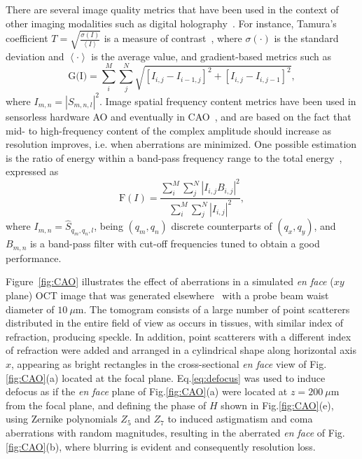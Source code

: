 There are several image quality metrics that have been used in the context of other imaging modalities such as digital holography~\cite{Trujillo2015_Comparative}. For instance, Tamura's coefficient $T = \sqrt{\frac{\sigma(I)}{\left<I\right>}}$ is a measure of contrast~\cite{Memmolo2011_Automatic}, where $\sigma(\cdot)$ is the standard deviation and $\left<\cdot\right>$ is the average value, and gradient-based metrics such as
\begin{equation}
	\text{G(I)} = \sum_i^M\sum_j^N \sqrt{\left[I_{i,j}-I_{i-1,j}\right] ^2 + \left[I_{i,j}-I_{i,j-1}\right] ^2},
\end{equation}
where $I_{m,n} = |S_{m,n,l}| ^ 2$. Image spatial frequency content metrics have been used in sensorless hardware AO and eventually in CAO~\cite{Debarre2007_Image}, and are based on the fact that mid- to high-frequency content of the complex amplitude should increase as resolution improves, i.e. when aberrations are minimized. One possible estimation is the ratio of energy within a band-pass frequency range to the total energy~\cite{Adie2012_Computational}, expressed as
\begin{equation}
	\text{F}(I) = \frac{\sum_i^M\sum_j^N |I_{i,j}B_{i,j}|^2 }{\sum_i^M\sum_j^N |I_{i,j}|^2},
\end{equation}
where $I_{m,n} = \hat{S}_{q_m, q_n,l}$, being $(q_m, q_n)$ discrete counterparts of $(q_x, q_y)$, and $B_{m,n}$ is a band-pass filter with cut-off frequencies tuned to obtain a good performance.

Figure~\ref{fig:CAO} illustrates the effect of aberrations in a simulated \textit{en face} ($xy$ plane) OCT image that was generated elsewhere~\cite{Cuartas-Velez2017_Formacion} with a probe beam waist diameter of $10~\mu$m. The tomogram consists of a large number of point scatterers distributed in the entire field of view as occurs in tissues, with similar index of refraction, producing speckle. In addition, point scatterers with a different index of refraction were added and arranged in a cylindrical shape along horizontal axis $x$, appearing as bright rectangles in the cross-sectional \textit{en face} view of Fig.\ref{fig:CAO}(a) located at the focal plane. Eq.\eqref{eq:defocus} was used to induce defocus as if the \textit{en face} plane of Fig.\ref{fig:CAO}(a) were located at $z=200~\mu$m from the focal plane, and defining the phase of $H$ shown in Fig.\ref{fig:CAO}(e), using Zernike polynomials $Z_5$ and $Z_7$ to induced astigmatism and coma aberrations with random magnitudes, resulting in the aberrated \textit{en face} of Fig.\ref{fig:CAO}(b), where blurring is evident and consequently resolution loss.


